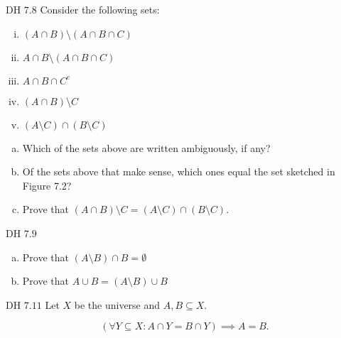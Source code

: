 \begin{frame}{}
  \begin{exampleblock}{DH $7.8$}
    Consider the following sets:
    \begin{enumerate}[(i)]
      \item $(A \cap B) \setminus (A \cap B \cap C)$
      \item $A \cap B \setminus (A \cap B \cap C)$
      \item $A \cap B \cap C^{c}$
      \item $(A \cap B) \setminus C$
      \item $(A \setminus C) \cap (B \setminus C)$
    \end{enumerate}

    \begin{enumerate}[(a)]
      \item Which of the sets above are written ambiguously, if any?
      \item Of the sets above that make sense, which ones equal the set sketched in Figure 7.2?
      \item Prove that $(A \cap B) \setminus C = (A \setminus C) \cap (B \setminus C)$.
    \end{enumerate}
  \end{exampleblock}
\end{frame}

\begin{frame}{}
  \begin{exampleblock}{DH $7.9$}
    \begin{enumerate}[(a)]
      \item Prove that $(A \setminus B) \cap B = \emptyset$
      \item Prove that $A \cup B = (A \setminus B) \cup B$
    \end{enumerate}
  \end{exampleblock}
\end{frame}

\begin{frame}{}
  \begin{exampleblock}{DH $7.11$}
    Let $X$ be the universe and $A, B \subseteq X$.

    \[
      (\forall Y \subseteq X: A \cap Y = B \cap Y) \implies A = B.
    \]
  \end{exampleblock}
\end{frame}

